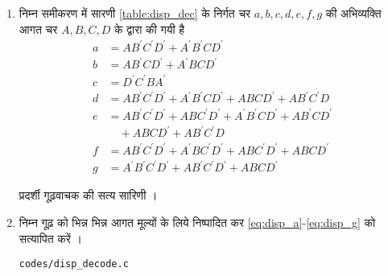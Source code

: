\renewcommand{\theequation}{\theenumi}
\renewcommand{\thefigure}{\theenumi}
\begin{enumerate}[label=\thesection.\arabic*.,ref=\thesection.\theenumi]

\item   निम्न समीकरण में  सारणी \ref{table:disp_dec}  के निर्गत चर  $a,b,c,d,e,f,g$ की अभिव्यक्ति आगत चर $A,B,C,D$ के द्वारा की गयी है
%
\begin{align}
\label{eq:disp_a}
a &= AB^{\prime}C^{\prime}D^{\prime}+A^{\prime}B^{\prime}CD^{\prime}
\\
\label{eq:disp_b}
b &= AB^{\prime}CD^{\prime}+A^{\prime}BCD^{\prime}
\\
\label{eq:disp_c}
c &= {D}^{\prime}{C}^{\prime}B{A}^{\prime}
\\
d &= AB^{\prime}C^{\prime}D^{\prime}+A^{\prime}B^{\prime}CD^{\prime}+ABCD^{\prime}+AB^{\prime}C^{\prime}D
\label{eq:disp_d}
\\
e &= AB^{\prime}C^{\prime}D^{\prime}+ABC^{\prime}D^{\prime}+A^{\prime}B^{\prime}CD^{\prime}+AB^{\prime}CD^{\prime}
\nonumber \\
&\quad +ABCD^{\prime}+AB^{\prime}C^{\prime}D
\label{eq:disp_e}
\\
f &= AB^{\prime}C^{\prime}D^{\prime}+A^{\prime}BC^{\prime}D^{\prime}+ABC^{\prime}D^{\prime}+ABCD^{\prime}
\label{eq:disp_f}
\\
g &= A^{\prime}B^{\prime}C^{\prime}D^{\prime}+AB^{\prime}C^{\prime}D^{\prime}+ABCD^{\prime}
\label{eq:disp_g}
\end{align}
\begin{table}
\centering

\caption{प्रदर्शी गूढ़वाचक की सत्य सारिणी ।}
\label{table:disp_dec}
\end{table}

\item निम्न गूढ़ को भिन्न भिन्न आगत मूल्यों के लिये निष्पादित कर \eqref{eq:disp_a}-\eqref{eq:disp_g} को सत्यापित करें ।

\label{code:disp_decode}
\begin{lstlisting}
codes/disp_decode.c
\end{lstlisting}
%
%

\end{enumerate}
%
%
